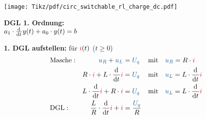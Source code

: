 {\begin{frame}[t]
\begin{minipage}{\textwidth}\centering
\begin{minipage}[t][][t]{0.48\textwidth}\centering\vspace{0cm}
\texttt{[image: Tikz/pdf/circ\_switchable\_rl\_charge\_dc.pdf]}
\end{minipage}
\begin{minipage}[t][][t]{0.48\textwidth}\centering\vspace{0cm}
    \vspace{0.8cm}
    \textbf{DGL 1. Ordnung:}\\[0.85em]
    $a_1 \cdot \frac{\mathrm{d}^{{}}}{\mathrm{d}t^{{}}} y(t) + a_0 \cdot y(t)=b$\\
\end{minipage}
\end{minipage}
\vspace{0.75cm}

\textbf{1. DGL aufstellen:} für ${\color{red}i}(t)$ ($t\geq 0$)\\[-1em]
\begin{align*}
&\text{Masche}:&
    \ecv{u_R} + \ecv{u_L}  &= \ecv{U_q}&
        &\text{mit}\quad \ecv{u_R} = R \cdot \eci{i} \\
&&
    R \cdot \eci{i} + L \cdot \dt \eci{i} &= \ecv{U_q} &
        &\text{mit}\quad \ecv{u_L} = L \cdot \dt \eci{i} \\
&&
    L \cdot \dt \eci{i} + R \cdot \eci{i} &= \ecv{U_q} &
        &\text{mit}\quad \ecv{u_L} = L \cdot \dt \eci{i} \\
&\text{DGL}:&
    \frac{L}{R} \cdot \dt \eci{i}  + \eci{i}  &= \frac{\ecv{U_q}}{R}
\end{align*}
\end{frame}

}
